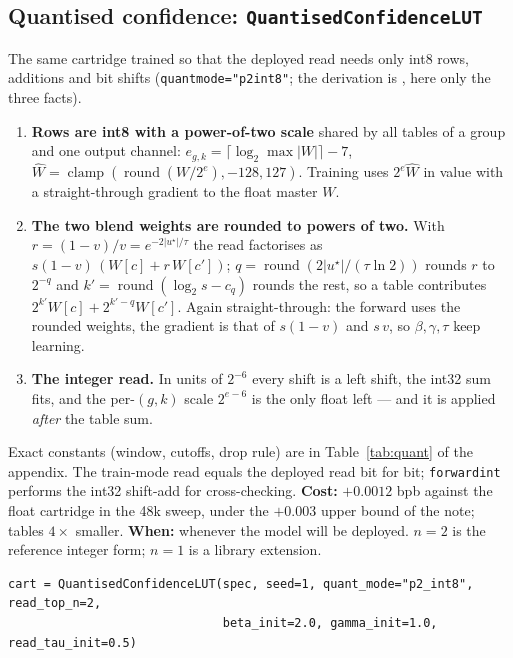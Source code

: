 \documentclass[11pt]{article}
\DeclareRobustCommand{\code}[1]{{\renewcommand{\_}{\textunderscore\allowbreak}\texttt{#1}}}
\begin{document}
\subsection{Quantised confidence: \code{QuantisedConfidenceLUT}}
\label{sec:quant}
The same cartridge trained so that the deployed read needs only int8 rows, additions and bit shifts
(\code{quant\_mode="p2\_int8"}; the derivation is \citealp{quantnote}, here only the three facts).
\begin{enumerate}\itemsep1pt
\item \textbf{Rows are int8 with a power-of-two scale} shared by all tables of a group and one output
  channel: $e_{g,k}=\lceil\log_2\max|W|\rceil-7$, $\hat W=\operatorname{clamp}(\operatorname{round}(W/2^{e}),-128,127)$.
  Training uses $2^{e}\hat W$ in value with a straight-through gradient to the float master $W$.
\item \textbf{The two blend weights are rounded to powers of two.} With $r=(1-v)/v=e^{-2|u^\star|/\tau}$
  the read factorises as $s(1-v)\,(W[c]+r\,W[c'])$; $q=\operatorname{round}(2|u^\star|/(\tau\ln2))$ rounds
  $r$ to $2^{-q}$ and $k'=\operatorname{round}(\log_2 s-c_q)$ rounds the rest, so a table contributes
  $2^{k'}W[c]+2^{k'-q}W[c']$. Again straight-through: the forward uses the rounded weights, the gradient
  is that of $s(1-v)$ and $s\,v$, so $\beta,\gamma,\tau$ keep learning.
\item \textbf{The integer read.} In units of $2^{-6}$ every shift is a left shift, the int32 sum fits, and
  the per-$(g,k)$ scale $2^{e-6}$ is the only float left --- and it is applied \emph{after} the table sum.
\end{enumerate}
Exact constants (window, cutoffs, drop rule) are in Table~\ref{tab:quant} of the appendix. The train-mode
read equals the deployed read bit for bit; \code{forward\_int} performs the int32 shift-add for
cross-checking. \textbf{Cost:} $+0.0012$ bpb against the float cartridge in the 48k sweep, under the
$+0.003$ upper bound of the note; tables $4\times$ smaller. \textbf{When:} whenever the model will be
deployed. $n{=}2$ is the reference integer form; $n{=}1$ is a library extension.
\begin{lstlisting}
cart = QuantisedConfidenceLUT(spec, seed=1, quant_mode="p2_int8", read_top_n=2,
                              beta_init=2.0, gamma_init=1.0, read_tau_init=0.5)
\end{lstlisting}
\end{document}
